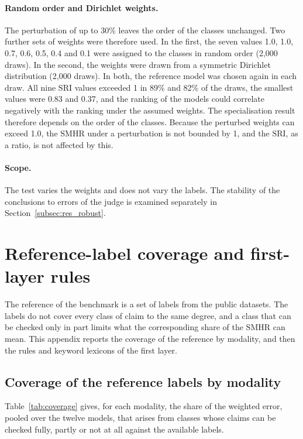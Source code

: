 \documentclass[11pt,a4paper]{article}
\newcommand{\SMHR}{\ensuremath{\mathrm{SMHR}}}
\newcommand{\SRI}{\ensuremath{\mathrm{SRI}}}
\begin{document}
\begin{appendices}
\paragraph{Random order and Dirichlet weights.} The perturbation of up to 30\% leaves the order of the classes unchanged. Two further sets of weights were therefore used. In the first, the seven values 1.0, 1.0, 0.7, 0.6, 0.5, 0.4 and 0.1 were assigned to the classes in random order (2{,}000 draws). In the second, the weights were drawn from a symmetric Dirichlet distribution (2{,}000 draws). In both, the reference model was chosen again in each draw. All nine \SRI{} values exceeded 1 in 89\% and 82\% of the draws, the smallest values were 0.83 and 0.37, and the ranking of the models could correlate negatively with the ranking under the assumed weights. The specialisation result therefore depends on the order of the classes. Because the perturbed weights can exceed 1.0, the \SMHR{} under a perturbation is not bounded by 1, and the \SRI{}, as a ratio, is not affected by this.

\paragraph{Scope.} The test varies the weights and does not vary the labels. The stability of the conclusions to errors of the judge is examined separately in Section~\ref{subsec:res_robust}.


\section{Reference-label coverage and first-layer rules}\label{app:coverage}

The reference of the benchmark is a set of labels from the public datasets. The labels do not cover every class of claim to the same degree, and a class that can be checked only in part limits what the corresponding share of the \SMHR{} can mean. This appendix reports the coverage of the reference by modality, and then the rules and keyword lexicons of the first layer.

\subsection{Coverage of the reference labels by modality}
Table~\ref{tab:coverage} gives, for each modality, the share of the weighted error, pooled over the twelve models, that arises from classes whose claims can be checked fully, partly or not at all against the available labels.


\end{appendices}
\end{document}
